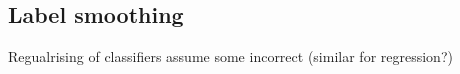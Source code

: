 
\subsection{Label smoothing}

Regualrising of classifiers assume some incorrect (similar for regression?)

